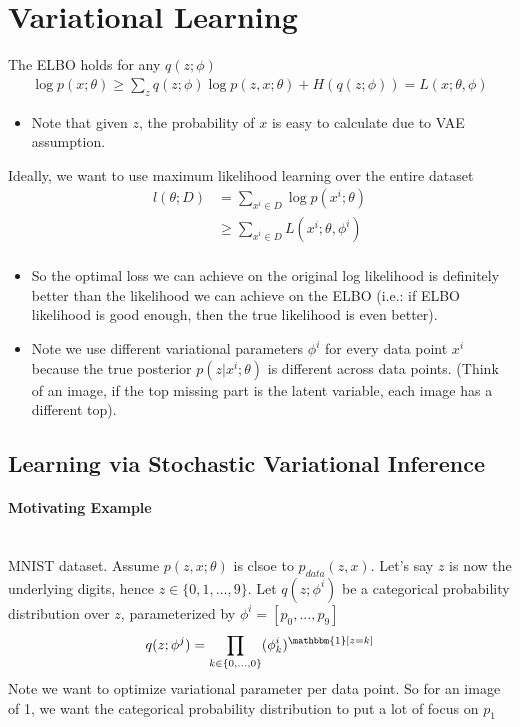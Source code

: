 \section{Variational Learning}
The ELBO holds for any $q(z;\phi)$
    \begin{align*}
        \log p(x;\theta) \geq \sum_z q(z;\phi) \log p(z, x;\theta) + H(q(z;\phi)) = L(x;\theta, \phi)
    \end{align*}
    \begin{itemize}
        \item Note that given $z$, the probability of $x$ is easy to calculate due to VAE assumption. 
    \end{itemize}
Ideally, we want to use maximum likelihood learning over the entire dataset 
    \begin{align*}
        l(\theta;D) 
        & = \sum_{x^i\in D} \log p(x^i; \theta) \tag{Ideal goal, but this is hard to compute} \\
        & \geq \sum_{x^i \in D} L(x^i; \theta, \phi^i) \tag{Use ELBO to approximate}\\
    \end{align*}
    \begin{itemize}
        \item So the optimal loss we can achieve on the original log likelihood is definitely better than the likelihood we can achieve on the ELBO (i.e.: if ELBO likelihood is good enough, then the true likelihood is even better). 
        \item Note we use different variational parameters $\phi^i$ for every data point $x^i$ because the true posterior $p(z|x^i;\theta)$ is different across data points. (Think of an image, if the top missing part is the latent variable, each image has a different top). 
    \end{itemize}

\subsection{Learning via Stochastic Variational Inference} 

\paragraph{Motivating Example}\mbox{}\\
MNIST dataset.  Assume $p(z,x;\theta)$ is clsoe to $p_{data}(z,x)$. Let's say $z$ is now the underlying digits, hence $z\in \{0,1,...,9\}$. Let $q(z;\phi^i)$ be a categorical probability distribution over $z$, parameterized by $\phi^i = [p_0, ..., p_9]$
    \begin{align*}
        q(z; \phi^j) = \prod_{k \in \{0,...,0\}} (\phi_k^i)^{\mathbbm{1}[z=k]}
    \end{align*}
Note we want to optimize variational parameter per data point. So for an image of 1, we want the categorical probability distribution to put a lot of focus on $p_1$



